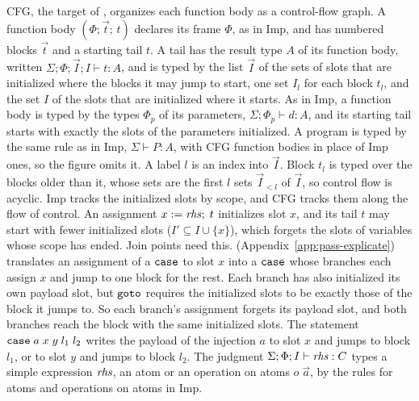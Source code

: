 CFG, the target of , organizes each function
body as a control-flow graph. A function body
$(\Phi; \vec{t};\, t)$ declares its frame $\Phi$, as in
Imp, and has numbered blocks $\vec{t}$ and a starting
tail $t$. A tail has the result type $A$ of its function body, written
$\Sigma; \Phi; \vec{I}; I \vdash t : A$, and is typed by the list
$\vec{I}$ of the sets of slots that are initialized
where the blocks it may jump to start, one set $I_l$ for each block $t_l$, and the set $I$ of the slots that are
initialized where it starts. As in Imp, a function body is typed by the
types $\Phi_p$ of its parameters, $\Sigma; \Phi_p \vdash d : A$, and its
starting tail starts with exactly the slots of the parameters initialized.
A program is typed by the same rule as in Imp, $\Sigma \vdash P : A$, with
CFG function bodies in place of Imp ones, so the figure omits it. A label $l$ is
an index into $\vec{I}$. Block $t_l$ is typed over the blocks older
than it, whose sets are the first $l$ sets $\vec{I}_{<l}$ of $\vec{I}$, so
control flow is acyclic. Imp tracks the initialized slots by scope, and CFG tracks them along
the flow of control. An assignment
$x \mathrel{:=} \mathit{rhs};\; t$ initializes slot $x$, and its tail $t$ may
start with fewer initialized slots ($I' \subseteq I \cup \{x\}$), which
forgets the slots of variables whose scope has ended. Join points need this.
 (Appendix~\ref{app:pass-explicate}) translates an
assignment of a $\mathtt{case}$ to slot $x$ into a $\mathtt{case}$ whose branches each
assign $x$ and jump to one block for the rest. Each branch has also
initialized its own payload slot, but $\mathtt{goto}$ requires the initialized
slots to be exactly those of the block it jumps to. So each branch's
assignment forgets its payload slot, and both branches reach the block with
the same initialized slots. The statement
$\mathtt{case}\;a\;x\;y\;l_1\;l_2$ writes the payload of the injection $a$
to slot $x$ and jumps to block $l_1$, or to slot $y$ and jumps to
block $l_2$. The judgment $\Sigma; \Phi; I \vdash \mathit{rhs} : C$ types a simple
expression $\mathit{rhs}$, an atom or an operation on atoms $o\;\vec{a}$, by the
rules for atoms and operations on atoms in Imp.
